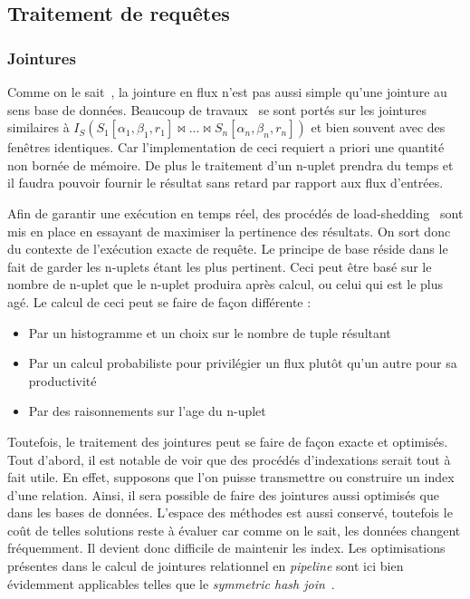 \subsection{Traitement de requêtes}
\subsubsection{Jointures}
Comme on le sait~\cite{Petit:astral}, la jointure en flux n'est pas aussi simple qu'une jointure au sens base de données. Beaucoup de travaux~\cite{Han:join, Srivastava:join, Law:join} se sont portés sur les jointures similaires à $I_S (S_1[\alpha_1,\beta_1,r_1] \Join ... \Join S_n[\alpha_n,\beta_n,r_n])$ et bien souvent avec des fenêtres identiques. Car l'implementation de ceci requiert a priori une quantité non bornée de mémoire. De plus le traitement d'un n-uplet prendra du temps et il faudra pouvoir fournir le résultat sans retard par rapport aux flux d'entrées. 

Afin de garantir une exécution en temps réel, des procédés de load-shedding~\cite{Tatbul:load-shedding} sont mis en place en essayant de maximiser la pertinence des résultats. On sort donc du contexte de l'exécution exacte de requête. Le principe de base réside dans le fait de garder les n-uplets étant les plus pertinent. Ceci peut être basé sur le nombre de n-uplet que le n-uplet produira après calcul, ou celui qui est le plus agé. Le calcul de ceci peut se faire de façon différente :
\begin{itemize}
 \item Par un histogramme et un choix sur le nombre de tuple résultant~\cite{Han:join}
 \item Par un calcul probabiliste pour privilégier un flux plutôt qu'un autre pour sa productivité~\cite{Han:join}
 \item Par des raisonnements sur l'age du n-uplet~\cite{Srivastava:join}
\end{itemize}

Toutefois, le traitement des jointures peut se faire de façon exacte et optimisés. Tout d'abord, il est notable de voir que des procédés d'indexations serait tout à fait utile. En effet, supposons que l'on puisse transmettre ou construire un index d'une relation. Ainsi, il sera possible de faire des jointures aussi optimisés que dans les bases de données. L'espace des méthodes est aussi conservé, toutefois le coût de telles solutions reste à évaluer car comme on le sait, les données changent fréquemment. Il devient donc difficile de maintenir les index. Les optimisations présentes dans le calcul de jointures relationnel en \textit{pipeline} sont ici bien évidemment applicables telles que le \textit{symmetric hash join}~\cite{Wilschut:symetricjoin}. 

